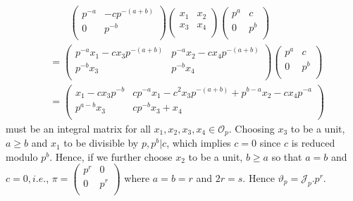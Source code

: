 \begin{align*}
  &\qquad\begin{pmatrix} p^{-a} &  -cp^{-(a+b)} \\ 0 & p^{-b}
  \\ \end{pmatrix} \begin{pmatrix} x_1 &  x_2 \\ x_3 & x_4
    \\ \end{pmatrix} \begin{pmatrix} p^a &  c \\ 0 & p^b
    \\ \end{pmatrix} \\ 
  &= \begin{pmatrix} p^{-a} x_1 -cx_3 p^{-(a+b)} &  p^{-a}x_2-cx_4
    p^{-(a+b)} \\ p^{-b}x_3 & p^{-b}x_4
    \\ \end{pmatrix} \begin{pmatrix} p^a &  c \\ 0 & p^b
    \\ \end{pmatrix} \\ 
  &= \begin{pmatrix} x_1-cx_3 p^{-b} & cp^{-a} x_1 -c^2x_3 p^{-(a+b)}
    + p^{b-a}x_2 -cx_4 p^{-a} \\ p^{a-b}x_3 & cp^{-b} x_3  +x_4
    \\ \end{pmatrix} 
\end{align*}
must be an integral matrix for all $ x_1, x_2, x_3,x_4 \in
\mathscr{O}_p $. Choosing $x_3 $ to be a unit, $ a \ge b $ and  $ x_1
$ to be divisible by $ p, p^b | c $, which implies  $ c = 0 $ since
$c$ is reduced modulo $ p^b $. Hence, if we further choose $ x_2 $ to
be a unit, $b\geq a $ so that $ a = b $ and $ c = 0, i.e. $, $ \pi
= \begin{pmatrix} p^r & 0 \\ 0 & p^r \\ \end{pmatrix} $ where $ a = b
= r $ and $ 2r = s $. Hence  $ \vartheta_p = \mathcal{J}_p.  p^r $. 

